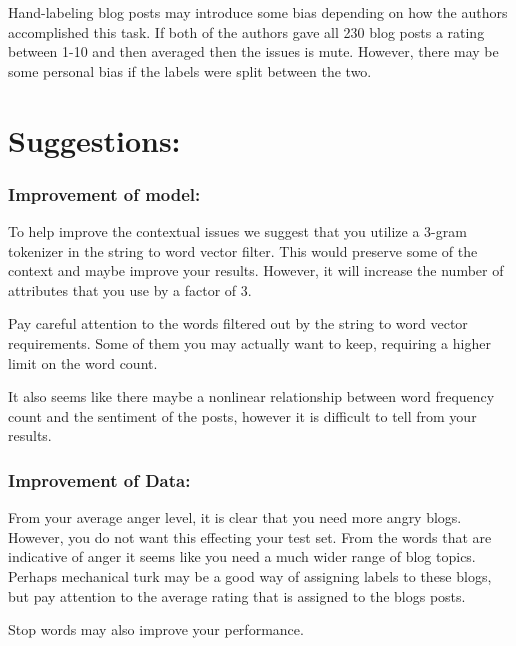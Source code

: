 \documentclass[12pt]{article}
\begin{document}
Hand-labeling blog posts may introduce some bias depending on how the authors accomplished this task. If both of the authors gave all 230 blog posts a rating between 1-10 and then averaged then the issues is mute. However, there may be some personal bias if the labels were split between the two. 

\section*{Suggestions:}
\subsubsection*{Improvement of model:}
To help improve the contextual issues we suggest that you utilize a 3-gram tokenizer in the string to word vector filter. This would preserve some of the context and maybe improve your results. However, it will increase the number of attributes that you use by a factor of 3. 

Pay careful attention to the words filtered out by the string to word vector requirements. Some of them you may actually want to keep, requiring a higher limit on the word count. 

It also seems like there maybe a nonlinear relationship between word frequency count and the sentiment of the posts, however it is difficult to tell from your results. 
\subsubsection*{Improvement of Data:}
From your average anger level, it is clear that you need more angry blogs. However, you do not want this effecting your test set. From the words that are indicative of anger it seems like you need a much wider range of blog topics. Perhaps mechanical turk may be a good way of assigning labels to these blogs, but pay attention to the average rating that is assigned to the blogs posts. 

Stop words may also improve your performance. 
\end{document}
